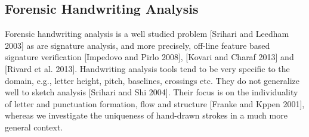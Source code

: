 \subsection{Forensic Handwriting Analysis}
\vspace{-2mm}
Forensic handwriting analysis is a well studied problem [Srihari and Leedham 2003] as are signature analysis, and more precisely, off-line feature based signature verification [Impedovo and Pirlo 2008], [Kovari and Charaf 2013] and [Rivard et al. 2013]. Handwriting analysis tools tend to be very specific to the domain, e.g., letter height, pitch, baselines, crossings etc. They do not generalize well to sketch analysis [Srihari and Shi 2004]. Their focus is on the individuality of letter and punctuation formation, flow and structure [Franke and Kppen 2001], whereas we investigate the uniqueness of hand-drawn strokes in a much more general context. 
\vspace{-2mm}
